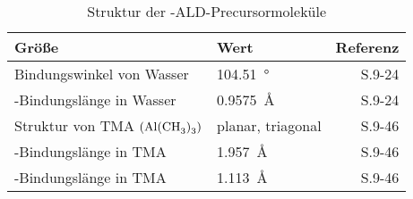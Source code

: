 \begin{table}[H]
  \centering
  \caption{Struktur der -ALD-Precursormoleküle}
  \evenrowcolors
  \begin{tabularx}{\textwidth}{|XXR|}
    \hline
    \textbf{Größe}                                & \textbf{Wert}          & \textbf{Referenz}             \\
    \hline
    Bindungswinkel von Wasser                     & \SI{104.51}{\degree}   & \cite{haynes_crc_2011} S.9-24 \\
    -Bindungslänge in Wasser              & \SI{0.9575}{\angstrom} & \cite{haynes_crc_2011} S.9-24 \\
    Struktur von TMA $\left(\ce{Al(CH3)3}\right)$ & planar, triagonal      & \cite{haynes_crc_2011} S.9-46 \\
    -Bindungslänge in TMA                & \SI{1.957}{\angstrom}  & \cite{haynes_crc_2011} S.9-46 \\
    -Bindungslänge  in TMA                & \SI{1.113}{\angstrom}  & \cite{haynes_crc_2011} S.9-46 \\
    \hline
  \end{tabularx}

\end{table}
